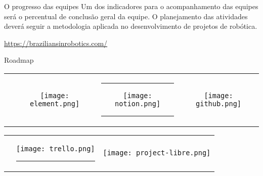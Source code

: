 \begin{frame}[t]{O progresso das equipes}
    Um dos indicadores para o acompanhamento das equipes será o percentual de conclusão geral da equipe.
    O planejamento das atividades deverá seguir a metodologia aplicada no desenvolvimento de projetos de robótica.
    \newline
    
    \url{https://braziliansinrobotics.com/}
\end{frame}

\begin{frame}[c]{Roadmap}
    \begin{tabular}{cccc}
        \rule{30pt}{0ex}  &   \texttt{[image: element.png]} & \rule{15pt}{0ex} \texttt{[image: notion.png]} \rule{15pt}{0ex}& \texttt{[image: github.png]}\\
    \end{tabular}

    \begin{tabular}{ccc}
        \phantom{This text invisible pp} &   \texttt{[image: trello.png]} \rule{5pt}{0ex}& \texttt{[image: project-libre.png]} \\
    \end{tabular}
\end{frame}
